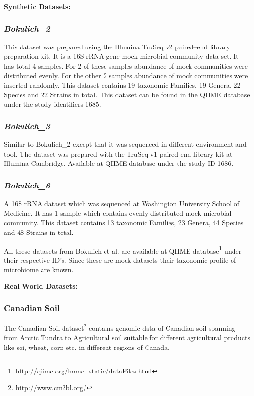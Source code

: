 \documentclass[10pt, conference, compsocconf]{IEEEtran}
\begin{document}
\textbf{Synthetic Datasets:}

\subsubsection{\textit{Bokulich\_2}}
This dataset was prepared using the Illumina TruSeq v2 paired--end library preparation kit. It is a 16S rRNA gene mock microbial community data set. It has total 4 samples. For 2 of these samples abundance of mock communities were distributed evenly. For the other 2 samples abundance of mock communities were inserted randomly. This dataset contains 19 taxonomic Families, 19 Genera, 22 Species and 22 Strains in total. This dataset can be found in the QIIME database under the study identifiers 1685.

\subsubsection{\textit{Bokulich\_3}}
Similar to Bokulich\_2 except that it was sequenced in different environment and tool. The dataset was prepared with the TruSeq v1 paired-end library kit at Illumina Cambridge. Available at QIIME database under the study ID 1686.

\subsubsection{\textit{Bokulich\_6}}
A 16S rRNA dataset which was sequenced at Washington University School of Medicine. It has 1 sample which contains evenly distributed mock microbial community. This dataset contains 13 taxonomic Families, 23 Genera, 44 Species and 48 Strains in total.

All these datasets from Bokulich et al.\cite{MARmockDatasetRef} are available at QIIME database\footnote{http://qiime.org/home\_static/dataFiles.html} under their respective ID's. Since these are mock datasets their taxonomic profile of microbiome are known.

\textbf{Real World Datasets:}

\subsubsection{Canadian Soil}
The Canadian Soil dataset\footnote{http://www.cm2bl.org/} contains genomic data of Canadian soil spanning from Arctic Tundra to Agricultural soil suitable for different agricultural products like soi, wheat, corn etc. in different regions of Canada.
\end{document}
